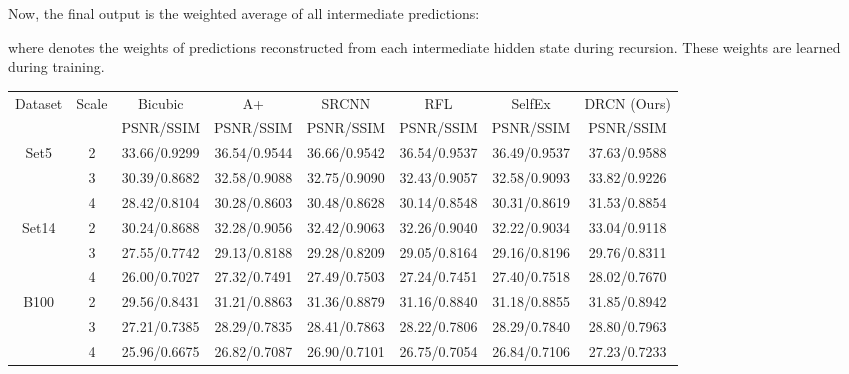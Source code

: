 \documentclass[10pt,twocolumn,letterpaper]{article}
\begin{document}
Now, the final output is the weighted average of all intermediate predictions:

where  denotes the weights of predictions reconstructed from each intermediate hidden state during recursion. These weights are learned during training.


\begin{table*}
\begin{center}
\setlength{\tabcolsep}{2pt}
\small
\begin{tabular}{ | c | c | c | c | c | c | c | c | }
\hline
\multirow{2}{*}{Dataset} & \multirow{2}{*}{Scale} & Bicubic & A+ \cite{Timofte} & SRCNN \cite{dong2014image} & RFL \cite{schulter2015fast} & SelfEx \cite{Huang-CVPR-2015} & DRCN (Ours)\\
 & & PSNR/SSIM & PSNR/SSIM & PSNR/SSIM & PSNR/SSIM & PSNR/SSIM & PSNR/SSIM\\
\hline
\hline
\multirow{3}{*}{Set5} & 2 & 33.66/0.9299 & 36.54/{\color{blue}0.9544} & {\color{blue}36.66}/0.9542 & 36.54/0.9537 & 36.49/0.9537 & {\color{red}37.63}/{\color{red}0.9588}\\
 & 3 & 30.39/0.8682 & 32.58/0.9088 & {\color{blue}32.75}/0.9090 & 32.43/0.9057 & 32.58/{\color{blue}0.9093} & {\color{red}33.82}/{\color{red}0.9226}\\
 & 4 & 28.42/0.8104 & 30.28/0.8603 & {\color{blue}30.48}/{\color{blue}0.8628} & 30.14/0.8548 & 30.31/0.8619 & {\color{red}31.53}/{\color{red}0.8854}\\
\hline
\hline
\multirow{3}{*}{Set14} & 2 & 30.24/0.8688 & 32.28/0.9056 & {\color{blue}32.42}/{\color{blue}0.9063} & 32.26/0.9040 & 32.22/0.9034 & {\color{red}33.04}/{\color{red}0.9118}\\
 & 3 & 27.55/0.7742 & 29.13/0.8188 & {\color{blue}29.28}/{\color{blue}0.8209} & 29.05/0.8164 & 29.16/0.8196 & {\color{red}29.76}/{\color{red}0.8311}\\
 & 4 & 26.00/0.7027 & 27.32/0.7491 & {\color{blue}27.49}/0.7503 & 27.24/0.7451 & 27.40/{\color{blue}0.7518} & {\color{red}28.02}/{\color{red}0.7670}\\
\hline
\hline
\multirow{3}{*}{B100} & 2 & 29.56/0.8431 & 31.21/0.8863 & {\color{blue}31.36}/{\color{blue}0.8879} & 31.16/0.8840 & 31.18/0.8855 & {\color{red}31.85}/{\color{red}0.8942}\\
 & 3 & 27.21/0.7385 & 28.29/0.7835 & {\color{blue}28.41}/{\color{blue}0.7863} & 28.22/0.7806 & 28.29/0.7840 & {\color{red}28.80}/{\color{red}0.7963}\\
 & 4 & 25.96/0.6675 & 26.82/0.7087 & {\color{blue}26.90}/0.7101 & 26.75/0.7054 & 26.84/{\color{blue}0.7106} & {\color{red}27.23}/{\color{red}0.7233}\\

\end{tabular}
\end{center}
\end{table*}
\end{document}
